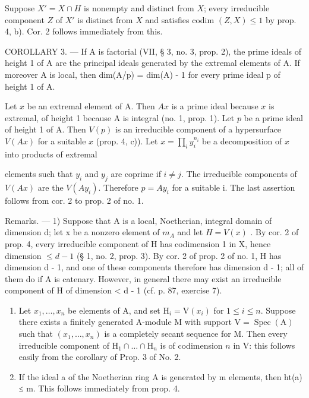 Suppose \(X' = X \cap H\) is nonempty and distinct from \(X\); every irreducible component \(Z\) of \(X'\) is distinct from \(X\) and satisfies codim \((Z, X) \leqslant 1\) by prop. 4, b). Cor. 2 follows immediately from this.

COROLLARY 3. --- If A is factorial (VII, § 3, no. 3, prop. 2), the prime ideals of height 1 of A are the principal ideals generated by the extremal elements of A. If moreover A is local, then dim(A/p) = dim(A) - 1 for every prime ideal p of height 1 of A.

Let \(x\) be an extremal element of A. Then \(Ax\) is a prime ideal because \(x\) is extremal, of height 1 because A is integral (no. 1, prop. 1). Let \(p\) be a prime ideal of height 1 of A. Then \(V(p)\) is an irreducible component of a hypersurface \(V(Ax)\) for a suitable \(x\) (prop. 4, c)). Let \(x = \prod_{i} y_{i}^{n_i}\) be a decomposition of \(x\) into products of extremal

elements such that \(y_{i}\) and \(y_{j}\) are coprime if \(i \neq j\). The irreducible components of \(V(Ax)\) are the \(V(Ay_{i})\). Therefore \(p = Ay_{i}\) for a suitable i. The last assertion follows from cor. 2 to prop. 2 of no. 1.

Remarks. --- 1) Suppose that A is a local, Noetherian, integral domain of dimension d; let x be a nonzero element of \(m_{A}\) and let \(H = V(x)\) . By cor. 2 of prop. 4, every irreducible component of H has codimension 1 in X, hence dimension \(\leqslant d - 1\) (§ 1, no. 2, prop. 3). By cor. 2 of prop. 2 of no. 1, H has dimension d - 1, and one of these components therefore has dimension d - 1; all of them do if A is catenary. However, in general there may exist an irreducible component of H of dimension \textless{} d - 1 (cf. p. 87, exercise 7).

\begin{enumerate}
\def\labelenumi{\arabic{enumi})}
\setcounter{enumi}{1}
\item
  Let \(x_1, \ldots, x_n\) be elements of A, and set \(\mathrm{H}_i = \mathrm{V}(x_i)\) for \(1 \leqslant i \leqslant n\). Suppose there exists a finitely generated A-module M with support \(\mathrm{V} = \operatorname{Spec}(\mathrm{A})\) such that \((x_1, \ldots, x_n)\) is a completely secant sequence for M. Then every irreducible component of \(\mathrm{H}_1 \cap \ldots \cap \mathrm{H}_n\) is of codimension \(n\) in V: this follows easily from the corollary of Prop. 3 of No. 2.
\item
  If the ideal a of the Noetherian ring A is generated by m elements, then ht(a) ≤ m. This follows immediately from prop. 4.
\end{enumerate}

